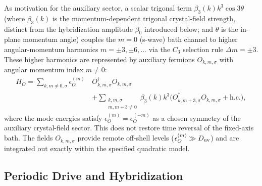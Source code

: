 \documentclass[%
  aps,physrev,onecolumn,10pt,amsmath,amssymb,superscriptaddress,longbibliography,floatfix
]{revtex4-2}
\newcommand{\gb}{\beta_0}               %
\begin{document}
As motivation for the auxiliary sector, a scalar trigonal term $\beta_3(k)k^3\cos3\theta$
(where $\beta_3(k)$ is the momentum-dependent trigonal crystal-field strength,
distinct from the hybridization amplitude $\gb$ introduced below;
and $\theta$ is the in-plane momentum angle) couples the
$m=0$ (s-wave) bath channel to higher angular-momentum harmonics $m=\pm3,\pm6,\ldots$ via the $C_3$ selection rule $\Delta m=\pm3$.
These higher harmonics are represented by auxiliary fermions
$O_{k,m,\sigma}$ with angular momentum index $m\neq0$:
\begin{equation}
\begin{split}
    H_O=\sum_{k,m\neq0,\sigma}
\epsilon_O^{(m)}\,&O^\dagger_{k,m,\sigma}O_{k,m,\sigma}\\
&+\sum_{\substack{k,m,\sigma\\m,m+3\ne0}}\beta_3(k)k^3
\bigl(O^\dagger_{k,m+3,\sigma}O_{k,m,\sigma}+\mathrm{h.c.}\bigr),
\label{eq:HO}
\end{split}
\end{equation}
where the mode energies satisfy $\epsilon_O^{(m)}=\epsilon_O^{(-m)}$
as a chosen symmetry of the auxiliary crystal-field sector.  This does not
restore time reversal of the fixed-axis bath.  The fields $O_{k,m,\sigma}$
provide remote off-shell levels ($\epsilon_O^{(m)}\gg D_{\rm uv}$) and are
integrated out exactly within the specified quadratic model.

\subsection{Periodic Drive and Hybridization}
\end{document}
